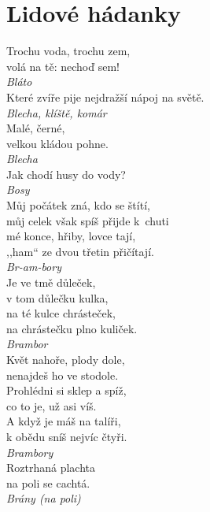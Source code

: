 
\section{Lidové hádanky}
\begin{multicols}{4}

\noindent
Trochu voda, trochu zem,\\
volá na tě: nechoď sem!\\[1 mm]
{\sl Bláto}\\

\noindent
Které zvíře pije nejdražší nápoj na světě.\\[1 mm]
{\sl Blecha, klíště, komár}\\

\noindent
Malé, černé,\\
velkou kládou pohne.\\[1 mm]
{\sl Blecha}\\

\noindent
Jak chodí husy do vody?\\[1 mm]
{\sl Bosy}\\

\noindent
Můj počátek zná, kdo se štítí,\\
můj celek však spíš přijde k~chuti\\
mé konce, hřiby, lovce tají,\\
,,ham`` ze dvou třetin přičítají.\\[1 mm]
{\sl Br-am-bory}\\

\noindent
Je ve tmě důleček,\\
v tom důlečku kulka,\\
na té kulce chrásteček,\\
na chrástečku plno kuliček.\\[1 mm]
{\sl Brambor}\\

\noindent
Květ nahoře, plody dole,\\
nenajdeš ho ve stodole.\\
Prohlédni si sklep a spíž,\\
co to je, už asi víš.\\
A když je máš na talíři,\\
k obědu sníš nejvíc čtyři.\\[1 mm]
{\sl Brambory}\\

\noindent
Roztrhaná plachta\\
na poli se cachtá.\\[1 mm]
{\sl Brány (na poli)}\\


\end{multicols}
